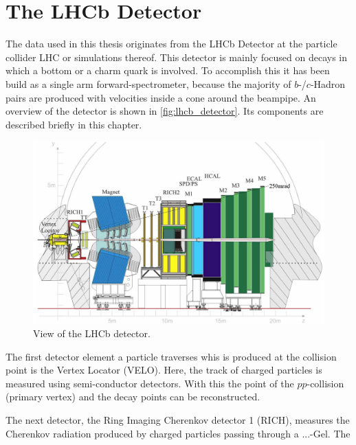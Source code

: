 \chapter{The LHCb Detector}

The data used in this thesis originates from the LHCb Detector at the particle collider LHC or simulations thereof.
This detector is mainly focused on decays in which a bottom or a charm quark is involved. 
To accomplish this it has been build as a single arm forward-spectrometer, because the majority of $b$-/$c$-Hadron pairs are produced with velocities inside a cone around the beampipe.
An overview of the detector is shown in \autoref{fig:lhcb_detector}.
Its components are described briefly in this chapter.

\begin{figure}
    \centering
    \includegraphics[width=\textwidth]{images/lhcb_detector.png}
    \caption{View of the LHCb detector. \cite{lhcb_detector}}
    \label{fig:lhcb_detector}
\end{figure}

The first detector element a particle traverses whis is produced at the collision point is the Vertex Locator (VELO). 
Here, the track of charged particles is measured using semi-conductor detectors. 
With this the point of the $pp$-collision (primary vertex) and the decay points can be reconstructed.

The next detector, the Ring Imaging Cherenkov detector 1 (RICH), measures the Cherenkov radiation produced by charged particles passing through a ...-Gel. 
The  

